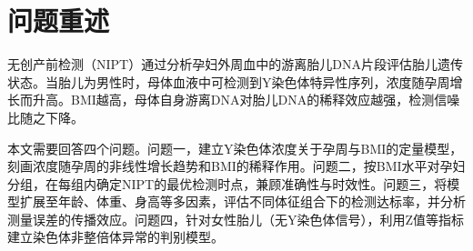 \section{问题重述}

无创产前检测（NIPT）通过分析孕妇外周血中的游离胎儿DNA片段评估胎儿遗传状态。当胎儿为男性时，母体血液中可检测到Y染色体特异性序列，浓度随孕周增长而升高。BMI越高，母体自身游离DNA对胎儿DNA的稀释效应越强，检测信噪比随之下降。

本文需要回答四个问题。问题一，建立Y染色体浓度关于孕周与BMI的定量模型，刻画浓度随孕周的非线性增长趋势和BMI的稀释作用。问题二，按BMI水平对孕妇分组，在每组内确定NIPT的最优检测时点，兼顾准确性与时效性。问题三，将模型扩展至年龄、体重、身高等多因素，评估不同体征组合下的检测达标率，并分析测量误差的传播效应。问题四，针对女性胎儿（无Y染色体信号），利用Z值等指标建立染色体非整倍体异常的判别模型。
